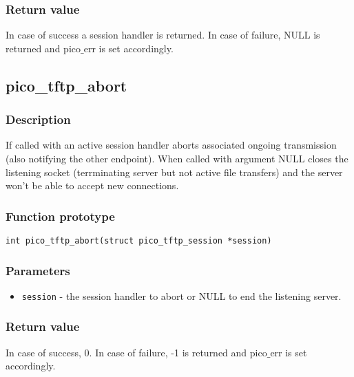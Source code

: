 \subsubsection*{Return value}
In case of success a session handler is returned. In case of failure, NULL is returned and pico$\_$err is set accordingly.



\subsection{pico\_tftp\_abort}
\subsubsection*{Description}
If called with an active session handler aborts associated ongoing transmission (also notifying the other endpoint).
When called with argument NULL closes the listening socket (terrminating server but not active file transfers) and the server won't be able to accept new connections.

\subsubsection*{Function prototype}
\begin{verbatim}
int pico_tftp_abort(struct pico_tftp_session *session)
\end{verbatim}

\subsubsection*{Parameters}
\begin{itemize}[noitemsep]
\item \texttt{session} - the session handler to abort or NULL to end the listening server.
\end{itemize}

\subsubsection*{Return value}
In case of success, 0. In case of failure, -1 is returned and pico$\_$err is set accordingly.


